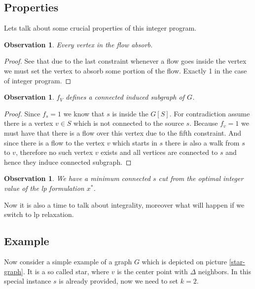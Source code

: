 \documentclass{article}
\theoremstyle{plain}
\newtheorem{observ}[thm]{Observation}
\theoremstyle{plain}
\theoremstyle{remark}
\begin{document}
	\subsection{Properties}
	
	Lets talk about some crucial properties of this integer program.
	
	\begin{observ}
		Every vertex in the flow absorb.
	\end{observ}

	\begin{proof}
		See that due to the last constraint whenever a flow goes inside the vertex we must set the vertex to absorb some portion of the flow. Exactly 1 in the case of integer program.
	\end{proof}

	\begin{observ}
		$f_V$ defines a connected induced subgraph of $G$.
	\end{observ}

	\begin{proof}
		Since $f_s = 1$ we know that $s$ is inside the $G[S]$. For contradiction assume there is a vertex $v \in S$ which is not connected to the source $s$. Because $f_v = 1$ we must have that there is a flow over this vertex due to the fifth constraint. And since there is a flow to the vertex $v$ which starts in $s$ there is also a walk from $s$ to $v$, therefore no such vertex $v$ exists and all vertices are connected to $s$ and hence they induce connected subgraph.
	\end{proof}

	\begin{observ}
		We have a minimum connected $s$ cut from the optimal integer value of the lp formulation $x^\ast$.
	\end{observ}

	Now it is also a time to talk about integrality, moreover what will happen if we switch to lp relaxation.
	
	\subsection{Example}
	
	Now consider a simple example of a graph $G$ which is depicted on picture \ref{star-graph}. It is a so called star, where $v$ is the center point with $\Delta$ neighbors. In this special instance $s$ is already provided, now we need to set $k = 2$.
	
\end{document}
